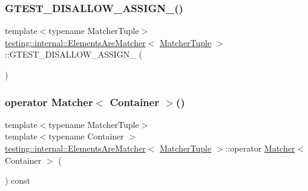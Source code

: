 \subsubsection{\texorpdfstring{G\+T\+E\+S\+T\+\_\+\+D\+I\+S\+A\+L\+L\+O\+W\+\_\+\+A\+S\+S\+I\+G\+N\+\_\+()}{GTEST\_DISALLOW\_ASSIGN\_()}}
{\footnotesize\ttfamily template$<$typename Matcher\+Tuple$>$ \\
\hyperlink{classtesting_1_1internal_1_1ElementsAreMatcher}{testing\+::internal\+::\+Elements\+Are\+Matcher}$<$ \hyperlink{structtesting_1_1internal_1_1MatcherTuple}{Matcher\+Tuple} $>$\+::G\+T\+E\+S\+T\+\_\+\+D\+I\+S\+A\+L\+L\+O\+W\+\_\+\+A\+S\+S\+I\+G\+N\+\_\+ (\begin{DoxyParamCaption}\item[{\hyperlink{classtesting_1_1internal_1_1ElementsAreMatcher}{Elements\+Are\+Matcher}$<$ \hyperlink{structtesting_1_1internal_1_1MatcherTuple}{Matcher\+Tuple} $>$}]{ }\end{DoxyParamCaption})\hspace{0.3cm}{\ttfamily [private]}}

\mbox{\label{classtesting_1_1internal_1_1ElementsAreMatcher_a6e6eaf8918c5d581b4b62ece23559be9}} 
\subsubsection{\texorpdfstring{operator Matcher$<$ Container $>$()}{operator Matcher< Container >()}}
{\footnotesize\ttfamily template$<$typename Matcher\+Tuple$>$ \\
template$<$typename Container $>$ \\
\hyperlink{classtesting_1_1internal_1_1ElementsAreMatcher}{testing\+::internal\+::\+Elements\+Are\+Matcher}$<$ \hyperlink{structtesting_1_1internal_1_1MatcherTuple}{Matcher\+Tuple} $>$\+::operator \hyperlink{classtesting_1_1Matcher}{Matcher}$<$ Container $>$ (\begin{DoxyParamCaption}{ }\end{DoxyParamCaption}) const\hspace{0.3cm}{\ttfamily [inline]}}



